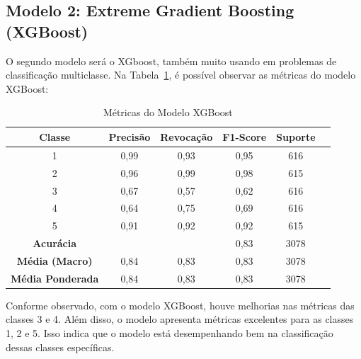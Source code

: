 \documentclass[12pt,oneside,a4paper,chapter=TITLE,
			   english,brazil]{abntex2}
\begin{document}





\vspace{\onelineskip}
\subsection{Modelo 2: Extreme Gradient Boosting (XGBoost)}
\vspace{\onelineskip}

 O segundo modelo será o XGboost,  também muito usando em problemas de classificação multiclasse.  Na Tabela~\ref{tab:xgboost}, é possível observar as métricas do modelo XGBoost:  


 


\begin{table}[H]
    \centering
    \caption[Métricas do Modelo XGBoost]{Métricas do Modelo XGBoost}
    \begin{tabular}{cccccc}
        \toprule
        \textbf{Classe} & \textbf{Precisão} & \textbf{Revocação} & \textbf{F1-Score} & \textbf{Suporte} \\
        \midrule
        1 & 0,99 & 0,93 & 0,95 & 616 \\
        2 & 0,96 & 0,99 & 0,98 & 615 \\
        3 & 0,67 & 0,57 & 0,62 & 616 \\
        4 & 0,64 & 0,75 & 0,69 & 616 \\
        5 & 0,91 & 0,92 & 0,92 & 615 \\
        \midrule
        \textbf{Acurácia} & & & 0,83 & 3078 \\
        \textbf{Média (Macro)} & 0,84 & 0,83 & 0,83 & 3078 \\
        \textbf{Média Ponderada} & 0,84 & 0,83 & 0,83 & 3078 \\
        \bottomrule
    \end{tabular}
    \label{tab:xgboost}
\end{table}
 \begin{flushleft}
\vspace{-1.5em}
\centering
{}
\end{flushleft}

Conforme observado, com o modelo XGBoost, houve melhorias nas métricas das classes 3 e 4. Além disso, o modelo apresenta métricas excelentes para as classes 1, 2 e 5. Isso indica que o modelo está desempenhando bem na classificação dessas classes específicas.    
\end{document}
